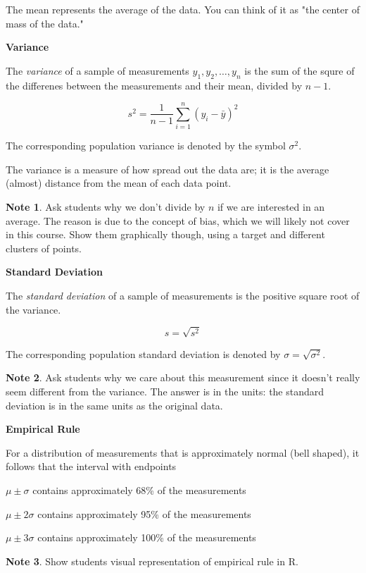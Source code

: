 \documentclass[11pt]{article}
\theoremstyle{definition}
\newtheorem{note}{Note}
\begin{document}
The mean represents the average of the data. You can think of it as "the center of mass of the data."

\begin{shaded}

	\textbf{Variance} \newline
	
	The \textit{variance} of a sample of measurements $y_1, y_2, \ldots, y_n$ is the sum of the squre of the differenes between the measurements and their mean, divided by $n-1$.
	
	$$
	s^2 = \frac{1}{n-1} \sum_{i=1}^n (y_i-\bar{y})^2
	$$
	
	The corresponding population variance is denoted by the symbol $\sigma^2$.

\end{shaded}

The variance is a measure of how spread out the data are; it is the average (almost) distance from the mean of each data point.

\begin{note}
	Ask students why we don't divide by $n$ if  we are interested in an average. The reason is due to the concept of bias, which we will likely not cover in this course. Show them graphically though, using a target and different clusters of points.
\end{note}

\begin{shaded}

	\textbf{Standard Deviation}
	
	The \textit{standard deviation} of a sample of measurements is the positive square root of the variance.
	
	$$
	s = \sqrt{s^2}
	$$
	
	The corresponding population standard deviation is denoted by $\sigma = \sqrt{\sigma^2}$.

\end{shaded}

\begin{note}
	Ask students why we care about this measurement since it doesn't really seem different from the variance. The answer is in the units: the standard deviation is in the same units as the original data.
\end{note}

\begin{shaded}

	\textbf{Empirical Rule}
	
	For a distribution of measurements that is approximately normal (bell shaped), it follows that the interval with endpoints
	
	\hspace{10mm} $\mu \pm \sigma$ contains approximately 68\% of the measurements
	
	\hspace{10mm} $\mu \pm 2\sigma$ contains approximately 95\% of the measurements
	
	\hspace{10mm} $\mu \pm 3\sigma$ contains approximately 100\% of the measurements

\end{shaded}

\begin{note}
	Show students visual representation of empirical rule in R.
\end{note}
\end{document}
